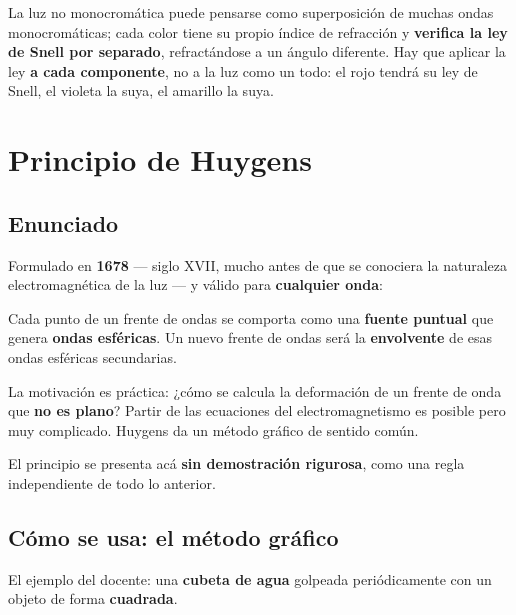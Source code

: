 \documentclass[12pt,a4paper]{article}
\begin{document}
\begin{warnbox}
La luz no monocromática puede pensarse como superposición de muchas ondas
monocromáticas; cada color tiene su propio índice de refracción y \textbf{verifica
la ley de Snell por separado}, refractándose a un ángulo diferente. Hay que
aplicar la ley \textbf{a cada componente}, no a la luz como un todo: el rojo
tendrá su ley de Snell, el violeta la suya, el amarillo la suya.
\end{warnbox}

\section{Principio de Huygens}

\subsection{Enunciado}

Formulado en \textbf{1678} --- siglo XVII, mucho antes de que se conociera la
naturaleza electromagnética de la luz --- y válido para \textbf{cualquier onda}:

\begin{keybox}
Cada punto de un frente de ondas se comporta como una \textbf{fuente puntual} que
genera \textbf{ondas esféricas}. Un nuevo frente de ondas será la
\textbf{envolvente} de esas ondas esféricas secundarias.
\end{keybox}

La motivación es práctica: ¿cómo se calcula la deformación de un frente de onda
que \textbf{no es plano}? Partir de las ecuaciones del electromagnetismo es
posible pero muy complicado. Huygens da un método gráfico de sentido común.

\begin{notebox}
El principio se presenta acá \textbf{sin demostración rigurosa}, como una regla
independiente de todo lo anterior.
\end{notebox}

\subsection{Cómo se usa: el método gráfico}

El ejemplo del docente: una \textbf{cubeta de agua} golpeada periódicamente con
un objeto de forma \textbf{cuadrada}.
\end{document}
